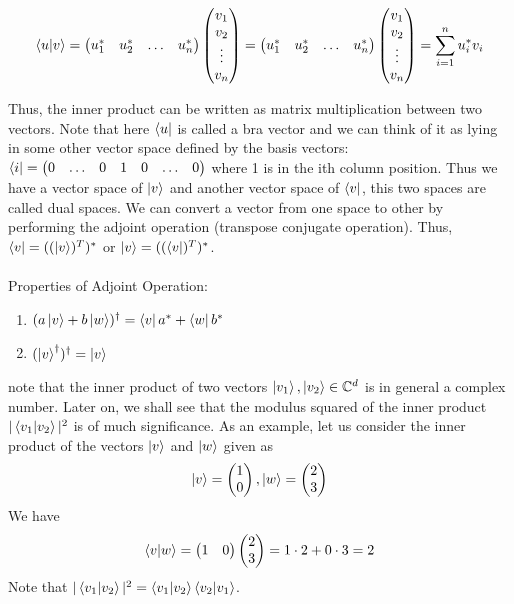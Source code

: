 \[
    \braket{u|v}=\begin{pmatrix} u_1^* & u_2^* & \ldots & u_n^* \end{pmatrix} \begin{pmatrix} v_1 \\ v_2 \\ \vdots \\ v_n \end{pmatrix}=\begin{pmatrix} u_1^* & u_2^* & \ldots & u_n^* \end{pmatrix} \begin{pmatrix} v_1 \\ v_2 \\ \vdots \\ v_n \end{pmatrix}=\sum_{i=1}^{n}u_i^*v_i
\]

Thus, the inner product can be written as matrix multiplication between two vectors. 
Note that here $\bra{u}$ is called a bra vector and we can think of it as lying in some other vector space defined by the basis vectors:
$\bra{i}=\begin{pmatrix} 0 & \ldots & 0 & 1 & 0 & \ldots & 0 \end{pmatrix}$ where 1 is in the ith column position. Thus we have a vector space of $\ket{v}$ and another vector space
of $\bra{v}$, this two spaces are called dual spaces. We can convert a vector from one space to other by performing the adjoint operation (transpose conjugate operation). Thus, $\bra{v}=((\ket{v})^{T})^{*}$ or $\ket{v}=((\bra{v})^{T})^{*}$. \\
\\
Properties of Adjoint Operation:
\begin{enumerate}
    \item $(a\ket{v}+b\ket{w})^{\dagger}=\bra{v}a^{*}+\bra{w}b^{*}$
    \item $(\ket{v}^{\dagger})^{\dagger}=\ket{v}$
\end{enumerate}

\begin{example}
    note that the inner product of two vectors $\ket{v_1},\ket{v_2} \in \mathbb{C}^d$ is in general a complex number. Later on, we shall see that the modulus squared of the inner product $|\braket{v_1|v_2}|^2$ is of much significance. As an example, let us consider the inner product of the vectors $\ket{v}$ and $\ket{w}$ given as
    \[
    \ket{v}=\begin{pmatrix} 1 \\0 \end{pmatrix},\ket{w}=\begin{pmatrix} 2 \\ 3 \end{pmatrix}
    \]
    We have
    \[
    \braket{v|w}=\begin{pmatrix} 1 & 0 \end{pmatrix} \begin{pmatrix}2 \\3 \end{pmatrix}=1\cdot 2+0\cdot 3 =2
    \]
    Note that $|\braket{v_1|v_2}|^2=\braket{v_1|v_2}\braket{v_2|v_1}$.
\end{example}
